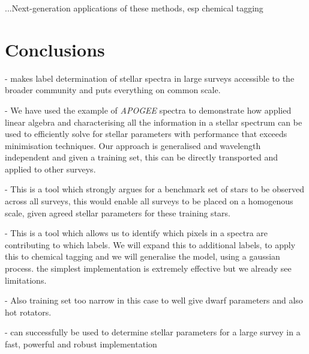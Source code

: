\documentclass[12pt, preprint]{aastex}
\begin{document}
...Next-generation applications of these methods, esp chemical tagging

\section{Conclusions}

- makes label determination of stellar spectra in large surveys accessible to the broader community and puts everything on common scale. 

- We have used the example of \textit{APOGEE} spectra to demonstrate how applied linear algebra and characterising all the information in a stellar spectrum can be used to efficiently solve for stellar parameters with performance that exceeds minimisation techniques. Our approach is generalised and wavelength independent and given a training set, this can be directly transported and applied to other surveys. 

- This is a tool which strongly argues for a benchmark set of stars to be observed across all surveys, this would enable all surveys to be placed on a homogenous scale, given agreed stellar parameters for these training stars. 

- This is a tool which allows us to identify which pixels in a spectra are contributing to which labels. We will expand this to additional labels, to apply this to chemical tagging and we will generalise the model, using a gaussian process. the simplest implementation is extremely effective but we already see limitations. 

- Also training set too narrow in this case to well give dwarf parameters and also hot rotators.  

- can successfully be used to determine stellar parameters for a large survey in a fast, powerful and robust implementation
\end{document}
